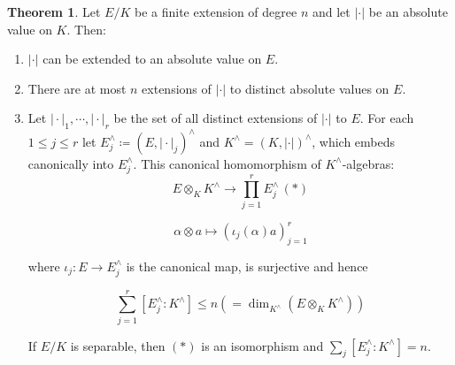 \documentclass[openany]{amsbook}
\numberwithin{section}{chapter}
\theoremstyle{definition}
\newtheorem{theorem}{Theorem}[chapter]
\begin{document}
\begin{theorem}
    Let \(E / K\) be a finite extension of degree \(n\) and let \(\vert \cdot \vert\) be an absolute value on \(K\). Then:

    \begin{enumerate}[label=\roman*)]
        \item \(\vert \cdot \vert\) can be extended to an absolute value on \(E\).
        \item There are at most \(n\) extensions of \(\vert \cdot \vert\) to distinct absolute values on \(E\). 
        \item Let \(\vert \cdot \vert _1, \cdots , \vert \cdot \vert_r\) be the set of all distinct extensions of \(\vert \cdot \vert \) to \(E\). For each \(1 \leq j \leq r\) let \(E_j^\wedge  \coloneqq (E, \vert \cdot \vert _j)^\wedge\) and \(K^\wedge = (K, \vert \cdot \vert)^\wedge\), which embeds canonically into \(E_j^\wedge\). This canonical homomorphism of \(K^\wedge\)-algebras:
        \[
            E \otimes_K K^\wedge \to \prod_{j=1}^r E_j^\wedge \, (\ast)
        \]

        \[
            \alpha \otimes a \mapsto (\iota_j(\alpha)a)_{j=1}^r
        \]

        where \(\iota_j : E \to E_j^\wedge\) is the canonical map, is surjective and hence
        
        \[
            \sum_{j=1}^r [E_j^\wedge : K^\wedge] \leq n \left( = \dim_{K^\wedge} (E \otimes_K K^\wedge) \right) 
        \]

        If \(E / K\) is separable, then \((\ast)\) is an isomorphism and \(\sum_{j} [E_j^\wedge : K^\wedge] = n\).
    \end{enumerate} 
\end{theorem}
\end{document}
